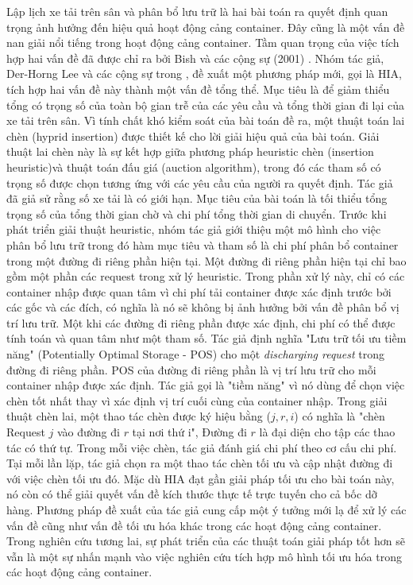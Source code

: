 \documentclass[11pt]{article}
\begin{document}
Lập lịch xe tải trên sân và phân bổ lưu trữ là hai bài toán ra quyết định quan trọng ảnh hưởng đến hiệu quả hoạt động cảng container. 
Đây cũng là một vấn đề nan giải nổi tiếng trong hoạt động cảng container. 
Tầm quan trọng của việc tích hợp hai vấn đề đã được chỉ ra bởi Bish và các cộng sự (2001) \cite{Bish:al:2001}.
Nhóm tác giả, Der-Horng Lee và các cộng sự trong \cite{Lee:al:2009}, đề xuất một phương pháp mới, gọi là HIA, tích hợp hai vấn đề này thành một vấn đề tổng thể. 
Mục tiêu là để giảm thiểu tổng có trọng số của toàn bộ gian trễ của các yêu cầu và tổng thời gian đi lại của xe tải trên sân. 
Vì tính chất khó kiểm soát của bài toán đề ra, một thuật toán lai chèn (hyprid insertion) được thiết kế cho lời giải hiệu quả của bài toán. 
Giải thuật lai chèn này là sự kết hợp giữa phương pháp heuristic chèn (insertion heuristic)và thuật toán đấu giá (auction algorithm), trong đó các tham số có trọng số được chọn tương ứng với các yêu cầu của người ra quyết định.
Tác giả đã giả sử rằng số xe tải là có giới hạn. 
Mục tiêu của bài toán là tối thiểu tổng trọng số của tổng thời gian chờ và chi phí tổng thời gian di chuyển. 
Trước khi phát triển giải thuật heuristic, nhóm tác giả giới thiệu một mô hình cho việc phân bổ lưu trữ trong đó hàm mục tiêu và tham số là chi phí phân bổ container trong một đường đi riêng phần hiện tại. Một đường đi riêng phần hiện tại chỉ bao gồm một phần các request trong xử lý heuristic. Trong phần xử lý này, chỉ có các container nhập được quan tâm vì chi phí tải container được xác định trước bởi các gốc và các đích, có nghĩa là nó sẽ không bị ảnh hưởng bởi vấn đề phân bổ vị trí lưu trữ. Một khi các đường đi riêng phần được xác định, chi phí có thể được tính toán và quan tâm như một tham số.
Tác giả định nghĩa "Lưu trữ tối ưu tiềm năng" (Potentially Optimal Storage - POS) cho một \textit{discharging request} trong đường đi riêng phần. POS của đường đi riêng phần là vị trí lưu trữ cho mỗi container nhập được xác định. 
Tác giả gọi là "tiềm năng" vì nó dùng để chọn việc chèn tốt nhất thay vì xác định vị trí cuối cùng của container nhập. 
Trong giải thuật chèn lai, một thao tác chèn được ký hiệu bằng ($j,r,i$) có nghĩa là "chèn Request $j$ vào đường đi $r$ tại nơi thứ i", Đường đi $r$ là đại diện cho tập các thao tác có thứ tự. Trong mỗi việc chèn, tác giả đánh giá chi phí theo cơ cấu chi phí. Tại mỗi lần lặp, tác giả chọn ra một thao tác chèn tối ưu và cập nhật đường đi với việc chèn tối ưu đó. 
Mặc dù HIA đạt gần giải pháp tối ưu cho bài toán này, nó còn có thể giải quyết vấn đề kích thước thực tế trực tuyến cho cả bốc dỡ hàng. Phương pháp đề xuất của tác giả cung cấp một ý tưởng mới lạ để xử lý các vấn đề cũng như vấn đề tối ưu hóa khác trong các hoạt động cảng container. Trong nghiên cứu tương lai, sự phát triển của các thuật toán giải pháp tốt hơn sẽ vẫn là một sự nhấn mạnh vào việc nghiên cứu tích hợp mô hình tối ưu hóa trong các hoạt động cảng container.
\end{document}
